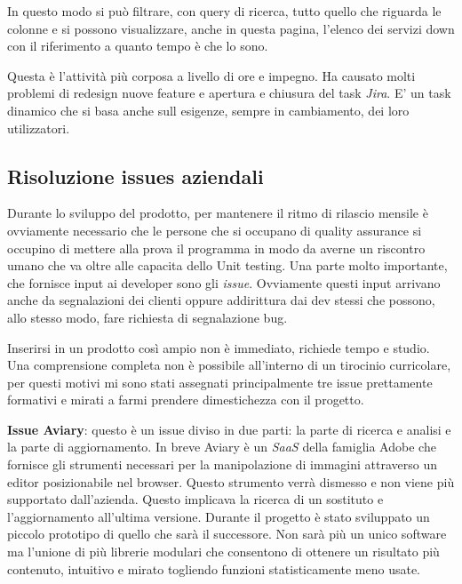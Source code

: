 \documentclass[a4paper]{article}
\begin{document}
\par In questo modo si può filtrare, con query di ricerca, tutto quello che riguarda le colonne
e si possono visualizzare, anche in questa pagina, l'elenco dei servizi down con il 
riferimento a quanto tempo è che lo sono. 
\par Questa è l'attività più corposa a livello di ore e impegno. Ha causato molti problemi di 
redesign nuove feature e apertura e chiusura del task \emph{Jira}. E' un task dinamico
che si basa anche sull esigenze, sempre in cambiamento, dei loro utilizzatori.

\subsection{Risoluzione issues aziendali}
\par Durante lo sviluppo del prodotto, per mantenere il ritmo di rilascio mensile è 
ovviamente necessario che le persone che si occupano di quality assurance si occupino 
di mettere alla prova il programma in modo da averne un riscontro umano che va oltre
alle capacita dello Unit testing. Una parte molto importante, che fornisce input
ai developer sono gli \emph{issue}. Ovviamente questi input arrivano anche da segnalazioni
dei clienti oppure addirittura dai dev stessi che possono, allo stesso modo, fare richiesta
di segnalazione bug.\\
\par Inserirsi in un prodotto così ampio non è immediato, richiede tempo e studio.
Una comprensione completa non è possibile all'interno di un tirocinio curricolare, per
questi motivi mi sono stati assegnati principalmente tre issue prettamente formativi 
e mirati a farmi prendere dimestichezza con il progetto.
\par \textbf{Issue Aviary}: questo è un issue diviso in due parti: la parte di ricerca 
e analisi e la parte di aggiornamento. In breve Aviary è un \emph{SaaS} della famiglia
Adobe che fornisce gli strumenti necessari per la manipolazione di immagini attraverso
un editor posizionabile nel browser. Questo strumento verrà dismesso e non viene più
supportato dall'azienda. Questo implicava la ricerca di un sostituto e l'aggiornamento all'ultima versione.
Durante il progetto è stato sviluppato un piccolo prototipo di quello che sarà il successore.
Non sarà più un unico software ma l'unione di più librerie modulari che consentono di
ottenere un risultato più contenuto, intuitivo e mirato togliendo funzioni statisticamente
meno usate.\\
\end{document}
